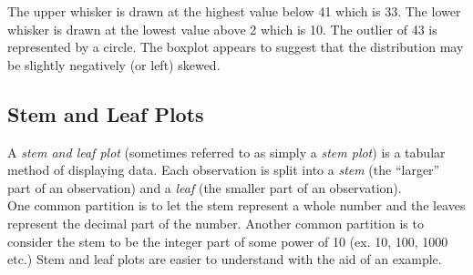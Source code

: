 \begin{example}
\noindent
The upper whisker is drawn at the highest value below 41 which is 33. The lower whisker is drawn at the lowest value above 2 which is 10. The outlier of 43 is represented by a circle. The boxplot appears to suggest that the distribution may be slightly negatively (or left) skewed.

\end{example}

\pagebreak


\subsection{Stem and Leaf Plots}

A \textit{stem and leaf plot} (sometimes referred to as simply a \textit{stem plot}) is a tabular method of displaying data.
Each observation is split into a \textit{stem} (the ``larger'' part of an observation) and a \textit{leaf} (the smaller part of an observation).\\

One common partition is to let the stem represent a whole number and the leaves represent the decimal part of the number.
Another common partition is to consider the stem to be the integer part of some power of 10 (ex. 10, 100, 1000 etc.) Stem and leaf plots are easier to understand with the aid of an example.

